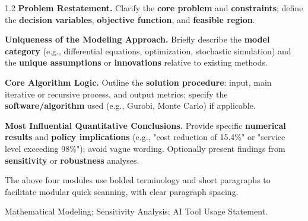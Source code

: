 \begin{spacing}{1.2}
\textbf{Problem Restatement.} Clarify the \textbf{core problem} and \textbf{constraints}; define the \textbf{decision variables}, \textbf{objective function}, and \textbf{feasible region}.

\textbf{Uniqueness of the Modeling Approach.} Briefly describe the \textbf{model category} (e.g., differential equations, optimization, stochastic simulation) and the \textbf{unique assumptions} or \textbf{innovations} relative to existing methods.

\textbf{Core Algorithm Logic.} Outline the \textbf{solution procedure}: input, main iterative or recursive process, and output metrics; specify the \textbf{software/algorithm} used (e.g., Gurobi, Monte Carlo) if applicable.

\textbf{Most Influential Quantitative Conclusions.} Provide specific \textbf{numerical results} and \textbf{policy implications} (e.g., "cost reduction of 15.4\%" or "service level exceeding 98\%"); avoid vague wording. Optionally present findings from \textbf{sensitivity} or \textbf{robustness} analyses.

\vspace{0.5em}
The above four modules use bolded terminology and short paragraphs to facilitate modular quick scanning, with clear paragraph spacing.
\end{spacing}

\begin{keywords}
Mathematical Modeling; Sensitivity Analysis; AI Tool Usage Statement.
\end{keywords}
